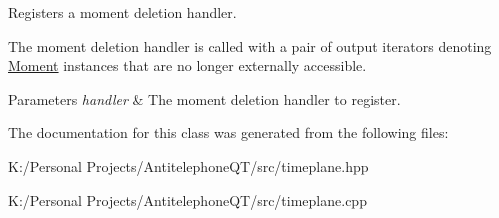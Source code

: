 Registers a moment deletion handler. 

The moment deletion handler is called with a pair of output iterators denoting {\ttfamily \hyperlink{classtimeplane_1_1_moment}{Moment}} instances that are no longer externally accessible. 
\begin{DoxyParams}{Parameters}
{\em handler} & The moment deletion handler to register. \\
\hline
\end{DoxyParams}


The documentation for this class was generated from the following files\+:\begin{DoxyCompactItemize}
\item 
K\+:/\+Personal Projects/\+Antitelephone\+Q\+T/src/timeplane.\+hpp\item 
K\+:/\+Personal Projects/\+Antitelephone\+Q\+T/src/timeplane.\+cpp\end{DoxyCompactItemize}
